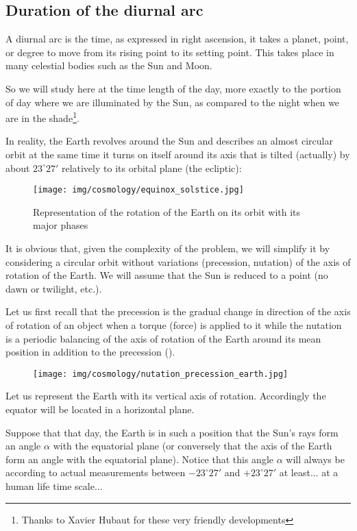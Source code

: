 	\subsection{Duration of the diurnal arc}
	A diurnal arc is the time, as expressed in right ascension, it takes a planet, point, or degree to move from its rising point to its setting point. This takes place in many celestial bodies such as the Sun and Moon.
	
	So we will study here at the time length of the day, more exactly to the portion of day where we are illuminated by the Sun, as compared to the night when we are in the shade\footnote{Thanks to Xavier Hubaut for these very friendly developments}.
	
	In reality, the Earth revolves around the Sun and describes an almost circular orbit at the same time it turns on itself around its axis that is tilted (actually) by about $23^\circ 27'$ relatively to its orbital plane (the ecliptic):
	\begin{figure}[H]
		\begin{center}
		\texttt{[image: img/cosmology/equinox\_solstice.jpg]}
		\end{center}	
		\caption{Representation of the rotation of the Earth on its orbit with its major phases}
	\end{figure}
	\begin{tcolorbox}[title=Remark,colframe=black,arc=10pt]
	It is obvious that, given the complexity of the problem, we will simplify it by considering a circular orbit without variations (precession, nutation) of the axis of rotation of the Earth. We will assume that the Sun is reduced to a point (no dawn or twilight, etc.).
	\end{tcolorbox}
	Let us first recall that the precession is the gradual change in direction of the axis of rotation of an object when a torque (force) is applied to it while the nutation is a periodic balancing of the axis of rotation of the Earth around its mean position in addition to the precession ().
	\begin{figure}[H]
		\begin{center}
		\texttt{[image: img/cosmology/nutation\_precession\_earth.jpg]}
		\end{center}
	\end{figure}
	Let us represent the Earth with its vertical axis of rotation. Accordingly the equator will be located in a horizontal plane.

	Suppose that that day, the Earth is in such a position that the Sun's rays form an angle $\alpha$ with the equatorial plane (or conversely that the axis of the Earth form an angle with the equatorial plane). Notice that this angle $\alpha$ will always be according to actual measurements  between $-23^\circ 27'$ and $+23^\circ 27'$ at least... at a human life time scale...
	
